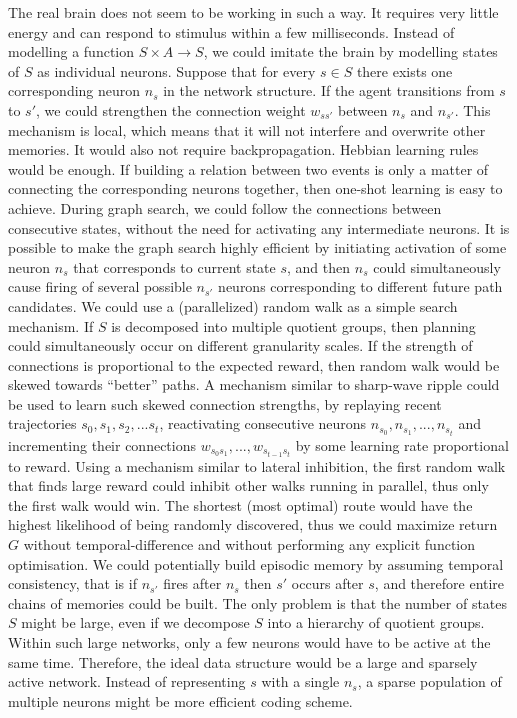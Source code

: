 \documentclass[12pt]{article}
\begin{document}
The real brain does not seem to be working in such a way. It requires very little energy and can respond to stimulus within a few milliseconds. Instead of modelling a function $S\times A \rightarrow S$, we could imitate the brain by modelling states of $S$ as individual neurons. Suppose that for every $s\in S$ there exists one corresponding neuron $n_s$ in the network structure. If the agent transitions from $s$ to $s'$, we could strengthen the connection weight $w_{ss'}$ between $n_s$ and $n_{s'}$. This mechanism is local, which means that it will not interfere and overwrite other memories. It would also not require backpropagation. Hebbian learning rules would be enough. If building a relation between two events is only a matter of connecting the corresponding neurons together, then one-shot learning is easy to achieve. During graph search, we could follow the connections between consecutive states, without the need for activating any intermediate neurons. It is possible to make the graph search highly efficient by initiating activation of some neuron $n_{s}$ that corresponds to current state $s$, and then $n_s$ could simultaneously cause firing of several possible $n_{s'}$ neurons corresponding to different future path candidates. We could use a (parallelized) random walk  as a simple search mechanism. If $S$ is decomposed into multiple quotient groups, then planning could simultaneously occur on different granularity scales. If the strength of connections is proportional to the expected reward, then random walk would be skewed towards ``better'' paths. A mechanism similar to sharp-wave ripple could be used to learn such skewed connection strengths, by replaying recent trajectories $s_0,s_1,s_2,...s_t$, reactivating consecutive neurons $n_{s_0},n_{s_1},...,n_{s_t}$ and incrementing their connections $w_{s_0s_1},...,w_{s_{t-1}s_t}$ by some learning rate proportional to reward. Using a mechanism similar to lateral inhibition, the first random walk that finds  large reward could inhibit other walks running in parallel, thus only the first walk would win. The shortest (most optimal) route would have the highest likelihood of being randomly discovered, thus we could maximize return $G$ without temporal-difference and without performing any explicit function optimisation. We could potentially build episodic memory by assuming temporal consistency, that is if $n_{s'}$ fires after $n_{s}$ then $s'$ occurs after $s$, and therefore entire chains of memories could be built. The only problem is that the number of states $S$ might be large, even if we decompose $S$ into a hierarchy of quotient groups. Within such large networks, only a few neurons would have to be active at the same time. Therefore, the ideal data structure would be a large and sparsely active network.  Instead of representing $s$ with a single $n_{s}$, a sparse population of multiple neurons might be more efficient coding scheme.
\end{document}
